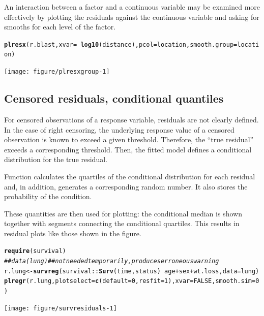 \documentclass[11pt]{article}\usepackage[]{graphicx}\usepackage[]{color}
\makeatletter
\newcommand{\hlnum}[1]{\textcolor[rgb]{0.686,0.059,0.569}{#1}}%
\newcommand{\hlcom}[1]{\textcolor[rgb]{0.678,0.584,0.686}{\textit{#1}}}%
\newcommand{\hlopt}[1]{\textcolor[rgb]{0,0,0}{#1}}%
\newcommand{\hlstd}[1]{\textcolor[rgb]{0.345,0.345,0.345}{#1}}%
\newcommand{\hlkwb}[1]{\textcolor[rgb]{0.69,0.353,0.396}{#1}}%
\newcommand{\hlkwc}[1]{\textcolor[rgb]{0.333,0.667,0.333}{#1}}%
\newcommand{\hlkwd}[1]{\textcolor[rgb]{0.737,0.353,0.396}{\textbf{#1}}}%
\newenvironment{kframe}{%
 \def\at@end@of@kframe{}%
 \ifinner\ifhmode%
  \def\at@end@of@kframe{\end{minipage}}%
  \begin{minipage}{\columnwidth}%
 \fi\fi%
 \def\FrameCommand##1{\hskip\@totalleftmargin \hskip-\fboxsep
 \colorbox{shadecolor}{##1}\hskip-\fboxsep
     \hskip-\linewidth \hskip-\@totalleftmargin \hskip\columnwidth}%
 \MakeFramed {\advance\hsize-\width
   \@totalleftmargin\z@ \linewidth\hsize
   \@setminipage}}%
 {\par\unskip\endMakeFramed%
 \at@end@of@kframe}
\newenvironment{knitrout}{}{} %
\makeatother
\begin{document}
An interaction between a factor and a continuous variable may be examined
more effectively by plotting the residuals against the continuous variable
and asking for smooths for each level of the factor.

\begin{knitrout}
\color{fgcolor}\begin{kframe}
\begin{alltt}
\hlkwd{plresx}\hlstd{(r.blast,} \hlkwc{xvar}\hlstd{=}\hlopt{~} \hlkwd{log10}\hlstd{(distance),} \hlkwc{pcol}\hlstd{=location,} \hlkwc{smooth.group}\hlstd{=location)}
\end{alltt}
\end{kframe}
\texttt{[image: figure/plresxgroup-1]} 
\end{knitrout}

\subsection{Censored residuals, conditional quantiles}

For censored observations of a response variable, residuals are not 
clearly defined.
In the case of right censoring, the underlying response value of a censored
observation is known to exceed a given threshold. Therefore, the 
``true residual'' exceeds a corresponding threshold.
Then, the fitted model defines a conditional distribution for the true residual.


Function  calculates the quartiles of the conditional
distribution for each residual and, in addition, generates a corresponding
random number. It also stores the probability of the condition.

These quantities are then used for plotting: the conditional median is 
shown together with segments connecting the conditional quartiles.
This results in residual plots like those shown in the figure.

\begin{knitrout}
\color{fgcolor}\begin{kframe}
\begin{alltt}
\hlkwd{require}\hlstd{(survival)}
\hlcom{## data(lung) ## not needed temporarily, produces erroneous warning}
\hlstd{r.lung} \hlkwb{<-} \hlkwd{survreg}\hlstd{(survival}\hlopt{::}\hlkwd{Surv}\hlstd{(time,status)} \hlopt{~} \hlstd{age}\hlopt{+}\hlstd{sex}\hlopt{+}\hlstd{wt.loss,} \hlkwc{data}\hlstd{=lung)}
\hlkwd{plregr}\hlstd{(r.lung,} \hlkwc{plotselect}\hlstd{=}\hlkwd{c}\hlstd{(}\hlkwc{default}\hlstd{=}\hlnum{0}\hlstd{,} \hlkwc{resfit}\hlstd{=}\hlnum{1}\hlstd{),} \hlkwc{xvar}\hlstd{=}\hlnum{FALSE}\hlstd{,} \hlkwc{smooth.sim}\hlstd{=}\hlnum{0}\hlstd{)}
\end{alltt}
\end{kframe}
\texttt{[image: figure/survresiduals-1]} 
\end{knitrout}
\end{document}

